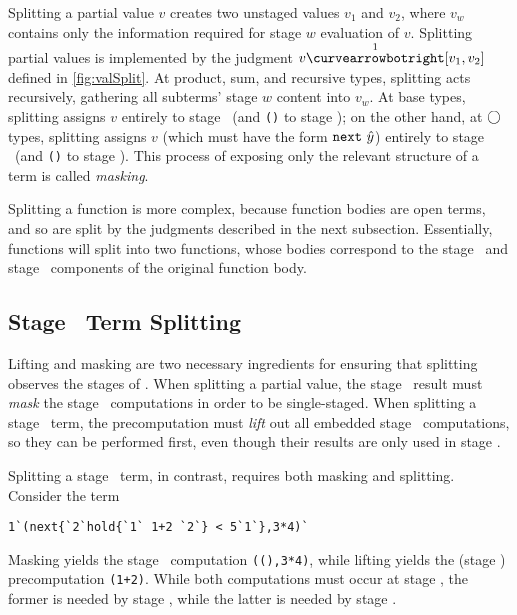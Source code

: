 Splitting a partial value $v$ creates two unstaged values $v_1$ and $v_2$,
where $v_w$ contains only the information required for stage $w$ evaluation of
$v$. Splitting partial values is implemented by the judgment $v \vsplito
[v_1,v_2]$ defined in \ref{fig:valSplit}. 
At product, sum, and recursive types, splitting acts recursively, gathering all
subterms' stage $w$ content into $v_w$. At base types, splitting assigns $v$
entirely to stage \bbone\ (and \texttt{()} to stage \bbtwo); on the other hand,
at $\bigcirc$ types, splitting assigns $v$ (which must have the form ${\tt next}~\hat y$)
entirely to stage \bbtwo\ (and \texttt{()} to stage \bbone). This process of
exposing only the relevant structure of a term is called \emph{masking}.


Splitting a function is more complex, because function bodies are open terms,
and so are split by the judgments described in the next subsection. Essentially,
functions will split into two functions, whose bodies correspond to the stage
\bbone\ and stage \bbtwo\ components of the original function body.


\subsection{Stage \bbone\ Term Splitting}

Lifting and masking are two necessary ingredients for ensuring that splitting
observes the stages of \lang. When splitting a partial value, the stage \bbone\
result must \emph{mask} the stage \bbtwo\ computations in order to be
single-staged. When splitting a stage \bbtwo\ term, the precomputation must
\emph{lift} out all embedded stage \bbone\ computations, so they can be
performed first, even though their results are only used in stage \bbtwo.

Splitting a stage \bbone\ term, in contrast, requires both masking and splitting.
Consider the term 
\begin{lstlisting}
1`(next{`2`hold{`1` 1+2 `2`} < 5`1`},3*4)`
\end{lstlisting}
Masking yields the stage \bbone\ computation \verb|((),3*4)|, while lifting
yields the (stage \bbone) precomputation \verb|(1+2)|. While both computations
must occur at stage \bbone, the former is needed by stage \bbone, while the
latter is needed by stage \bbtwo.


